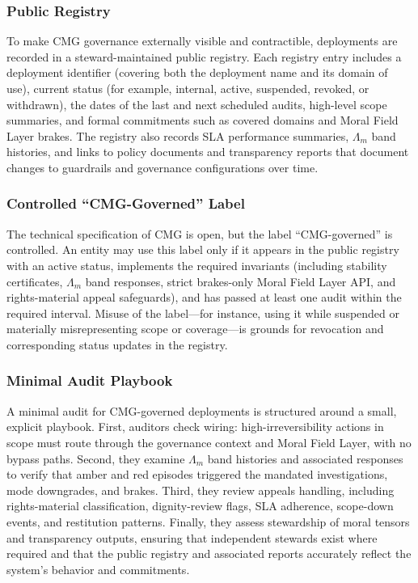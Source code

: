 \documentclass[11pt]{article}
\begin{document}
\subsubsection{Public Registry}

To make CMG governance externally visible and contractible, deployments are recorded in a steward-maintained public registry. Each registry entry includes a deployment identifier (covering both the deployment name and its domain of use), current status (for example, internal, active, suspended, revoked, or withdrawn), the dates of the last and next scheduled audits, high-level scope summaries, and formal commitments such as covered domains and Moral Field Layer brakes. The registry also records SLA performance summaries, \(\Lambda_m\) band histories, and links to policy documents and transparency reports that document changes to guardrails and governance configurations over time.

\subsubsection{Controlled ``CMG-Governed'' Label}

The technical specification of CMG is open, but the label ``CMG-governed'' is controlled. An entity may use this label only if it appears in the public registry with an active status, implements the required invariants (including stability certificates, \(\Lambda_m\) band responses, strict brakes-only Moral Field Layer API, and rights-material appeal safeguards), and has passed at least one audit within the required interval. Misuse of the label—for instance, using it while suspended or materially misrepresenting scope or coverage—is grounds for revocation and corresponding status updates in the registry.

\subsubsection{Minimal Audit Playbook}

A minimal audit for CMG-governed deployments is structured around a small, explicit playbook. First, auditors check wiring: high-irreversibility actions in scope must route through the governance context and Moral Field Layer, with no bypass paths. Second, they examine \(\Lambda_m\) band histories and associated responses to verify that amber and red episodes triggered the mandated investigations, mode downgrades, and brakes. Third, they review appeals handling, including rights-material classification, dignity-review flags, SLA adherence, scope-down events, and restitution patterns. Finally, they assess stewardship of moral tensors and transparency outputs, ensuring that independent stewards exist where required and that the public registry and associated reports accurately reflect the system’s behavior and commitments.
\end{document}
